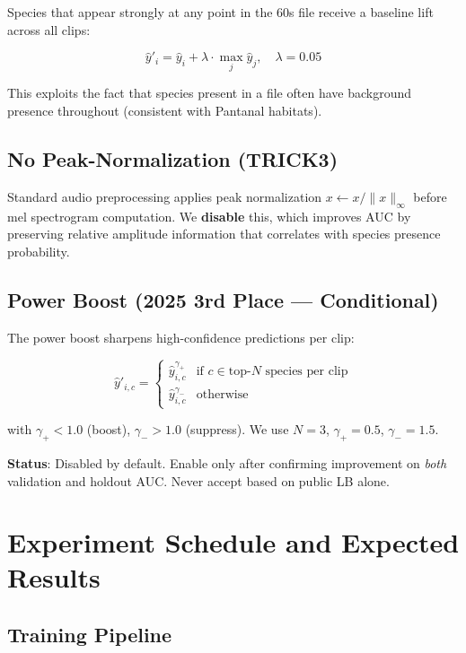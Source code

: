 \documentclass[11pt,a4paper]{article}
\begin{document}
Species that appear strongly at any point in the 60s file receive a baseline
lift across all clips:

\[
\hat{y}'_i = \hat{y}_i + \lambda \cdot \max_{j} \hat{y}_j, \quad \lambda = 0.05
\]

This exploits the fact that species present in a file often have background
presence throughout (consistent with Pantanal habitats).

\subsection{No Peak-Normalization (TRICK3)}

Standard audio preprocessing applies peak normalization
$x \leftarrow x / \|x\|_{\infty}$ before mel spectrogram computation.
We \textbf{disable} this, which improves AUC by preserving relative amplitude
information that correlates with species presence probability.

\subsection{Power Boost (2025 3rd Place — Conditional)}

The power boost sharpens high-confidence predictions per clip:

\[
\hat{y}'_{i,c} =
\begin{cases}
\hat{y}_{i,c}^{\gamma_+} & \text{if } c \in \text{top-}N \text{ species per clip} \\
\hat{y}_{i,c}^{\gamma_-} & \text{otherwise}
\end{cases}
\]

with $\gamma_+ < 1.0$ (boost), $\gamma_- > 1.0$ (suppress). We use
$N=3$, $\gamma_+=0.5$, $\gamma_-=1.5$.

\noindent\textbf{Status}: Disabled by default. Enable only after confirming improvement
on \emph{both} validation and holdout AUC. Never accept based on public LB alone.

\section{Experiment Schedule and Expected Results}
\label{sec:schedule}

\subsection{Training Pipeline}
\end{document}
